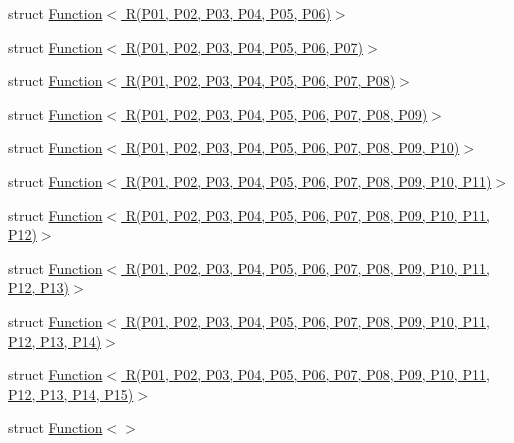 \begin{DoxyCompactItemize}
\item 
struct \hyperlink{structLoki_1_1Function_3_01R_07P01_00_01P02_00_01P03_00_01P04_00_01P05_00_01P06_08_4}{Function$<$ R(\+P01, P02, P03, P04, P05, P06)$>$}
\item 
struct \hyperlink{structLoki_1_1Function_3_01R_07P01_00_01P02_00_01P03_00_01P04_00_01P05_00_01P06_00_01P07_08_4}{Function$<$ R(\+P01, P02, P03, P04, P05, P06, P07)$>$}
\item 
struct \hyperlink{structLoki_1_1Function_3_01R_07P01_00_01P02_00_01P03_00_01P04_00_01P05_00_01P06_00_01P07_00_01P08_08_4}{Function$<$ R(\+P01, P02, P03, P04, P05, P06, P07, P08)$>$}
\item 
struct \hyperlink{structLoki_1_1Function_3_01R_07P01_00_01P02_00_01P03_00_01P04_00_01P05_00_01P06_00_01P07_00_01P08_00_01P09_08_4}{Function$<$ R(\+P01, P02, P03, P04, P05, P06, P07, P08, P09)$>$}
\item 
struct \hyperlink{structLoki_1_1Function_3_01R_07P01_00_01P02_00_01P03_00_01P04_00_01P05_00_01P06_00_01P07_00_01P08_00_01P09_00_01P10_08_4}{Function$<$ R(\+P01, P02, P03, P04, P05, P06, P07, P08, P09, P10)$>$}
\item 
struct \hyperlink{structLoki_1_1Function_3_01R_07P01_00_01P02_00_01P03_00_01P04_00_01P05_00_01P06_00_01P07_00_01P0a6217492d252c71a7ad78695e04652dc}{Function$<$ R(\+P01, P02, P03, P04, P05, P06, P07, P08, P09, P10, P11)$>$}
\item 
struct \hyperlink{structLoki_1_1Function_3_01R_07P01_00_01P02_00_01P03_00_01P04_00_01P05_00_01P06_00_01P07_00_01P043fbf9f6fa62af338151c82c348569d1}{Function$<$ R(\+P01, P02, P03, P04, P05, P06, P07, P08, P09, P10, P11, P12)$>$}
\item 
struct \hyperlink{structLoki_1_1Function_3_01R_07P01_00_01P02_00_01P03_00_01P04_00_01P05_00_01P06_00_01P07_00_01P0c0ed039e3c26eca6bfcbf0d14db9de6b}{Function$<$ R(\+P01, P02, P03, P04, P05, P06, P07, P08, P09, P10, P11, P12, P13)$>$}
\item 
struct \hyperlink{structLoki_1_1Function_3_01R_07P01_00_01P02_00_01P03_00_01P04_00_01P05_00_01P06_00_01P07_00_01P0376b58c87c711311c6a7d2cd527487a6}{Function$<$ R(\+P01, P02, P03, P04, P05, P06, P07, P08, P09, P10, P11, P12, P13, P14)$>$}
\item 
struct \hyperlink{structLoki_1_1Function_3_01R_07P01_00_01P02_00_01P03_00_01P04_00_01P05_00_01P06_00_01P07_00_01P0c41dcf0ca70925521bf844f3beedb2ae}{Function$<$ R(\+P01, P02, P03, P04, P05, P06, P07, P08, P09, P10, P11, P12, P13, P14, P15)$>$}
\item 
struct \hyperlink{structLoki_1_1Function_3_4}{Function$<$$>$}

\end{DoxyCompactItemize}
